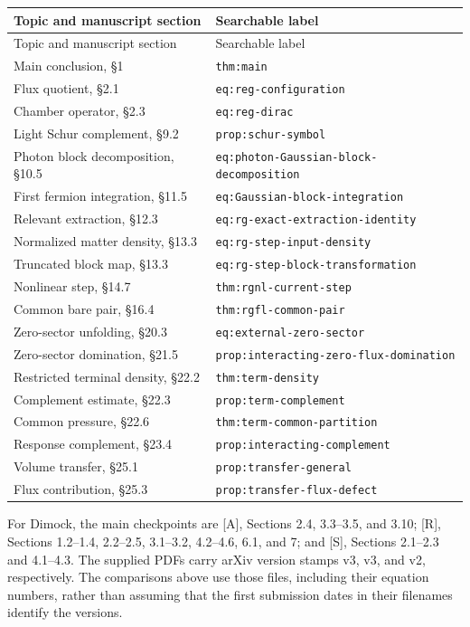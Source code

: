 \documentclass[11pt]{article}
\numberwithin{equation}{section}
\newcommand{\AG}{\textup{[A]}}
\newcommand{\UR}{\textup{[R]}}
\newcommand{\US}{\textup{[S]}}
\newcommand{\qlabel}[1]{\nolinkurl{#1}}
\begin{document}
\small
\begin{longtable}{@{}P{0.29\textwidth}P{0.65\textwidth}@{}}
\toprule
Topic and manuscript section & Searchable label\\
\midrule
\endfirsthead
\toprule Topic and manuscript section & Searchable label\\\midrule
\endhead
Main conclusion, \S1 & \qlabel{thm:main}\\[4pt]
Flux quotient, \S2.1 & \qlabel{eq:reg-configuration}\\[4pt]
Chamber operator, \S2.3 & \qlabel{eq:reg-dirac}\\[4pt]
Light Schur complement, \S9.2 & \qlabel{prop:schur-symbol}\\[4pt]
Photon block decomposition, \S10.5 &
\qlabel{eq:photon-Gaussian-block-decomposition}\\[4pt]
First fermion integration, \S11.5 & \qlabel{eq:Gaussian-block-integration}\\[4pt]
Relevant extraction, \S12.3 & \qlabel{eq:rg-exact-extraction-identity}\\[4pt]
Normalized matter density, \S13.3 & \qlabel{eq:rg-step-input-density}\\[4pt]
Truncated block map, \S13.3 & \qlabel{eq:rg-step-block-transformation}\\[4pt]
Nonlinear step, \S14.7 & \qlabel{thm:rgnl-current-step}\\[4pt]
Common bare pair, \S16.4 & \qlabel{thm:rgfl-common-pair}\\[4pt]
Zero-sector unfolding, \S20.3 & \qlabel{eq:external-zero-sector}\\[4pt]
Zero-sector domination, \S21.5 &
\qlabel{prop:interacting-zero-flux-domination}\\[4pt]
Restricted terminal density, \S22.2 & \qlabel{thm:term-density}\\[4pt]
Complement estimate, \S22.3 & \qlabel{prop:term-complement}\\[4pt]
Common pressure, \S22.6 & \qlabel{thm:term-common-partition}\\[4pt]
Response complement, \S23.4 & \qlabel{prop:interacting-complement}\\[4pt]
Volume transfer, \S25.1 & \qlabel{prop:transfer-general}\\[4pt]
Flux contribution, \S25.3 & \qlabel{prop:transfer-flux-defect}\\
\bottomrule
\end{longtable}
\normalsize

For Dimock, the main checkpoints are \AG, Sections 2.4, 3.3--3.5,
and 3.10; \UR, Sections 1.2--1.4, 2.2--2.5, 3.1--3.2, 4.2--4.6,
6.1, and 7; and \US, Sections 2.1--2.3 and 4.1--4.3.
The supplied PDFs carry arXiv version stamps v3, v3, and v2,
respectively. The comparisons above use those files, including their
equation numbers, rather than assuming that the first submission
dates in their filenames identify the versions.
\end{document}
